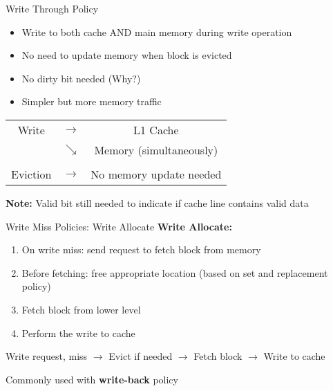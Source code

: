 \documentclass[aspectratio=169,12pt]{beamer}
\begin{document}
\begin{frame}{Write Through Policy}
\begin{itemize}
    \item Write to both cache AND main memory during write operation
    \item No need to update memory when block is evicted
    \item \alert{No dirty bit needed} (Why?)
    \item Simpler but more memory traffic
\end{itemize}

\begin{center}
\begin{tcolorbox}[colback=green!10, width=0.8\textwidth]
\begin{tabular}{c c c}
Write & $\rightarrow$ & L1 Cache \\
      & $\searrow$ & Memory (simultaneously)\\
& & \\
Eviction & $\rightarrow$ & No memory update needed
\end{tabular}
\end{tcolorbox}
\end{center}

\textbf{Note:} Valid bit still needed to indicate if cache line contains valid data
\end{frame}

\begin{frame}{Write Miss Policies: Write Allocate}
\textbf{Write Allocate:}
\begin{enumerate}
    \item On write miss: send request to fetch block from memory
    \item Before fetching: free appropriate location (based on set and replacement policy)
    \item Fetch block from lower level
    \item Perform the write to cache
\end{enumerate}

\begin{center}
\begin{tcolorbox}[colback=yellow!10, width=0.9\textwidth]
Write request, miss $\rightarrow$ Evict if needed $\rightarrow$ Fetch block $\rightarrow$ Write to cache
\end{tcolorbox}
\end{center}

Commonly used with \textbf{write-back} policy
\end{frame}
\end{document}
